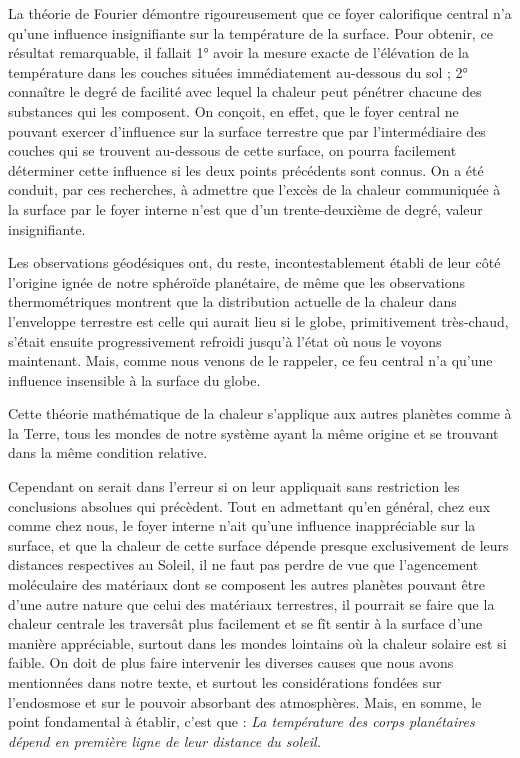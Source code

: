 \documentclass[a4paper, 11pt, oneside]{article}
\begin{document}
La théorie de Fourier démontre rigoureusement que ce foyer calorifique central n'a qu'une influence insignifiante sur la température de la surface. Pour obtenir, ce résultat remarquable, il fallait 1° avoir la mesure exacte de l'élévation de la température dans les couches situées immédiatement au-dessous du sol ; 2° connaître le degré de facilité avec lequel la chaleur peut pénétrer chacune des substances qui les composent. On conçoit, en effet, que le foyer central ne pouvant exercer d'influence sur la surface terrestre que par l'intermédiaire des couches qui se trouvent au-dessous de cette surface, on pourra facilement déterminer cette influence si les deux points précédents sont connus. On a été conduit, par ces recherches, à admettre que l'excès de la chaleur communiquée à la surface par le foyer interne n'est que d'un trente-deuxième de degré, valeur insignifiante.

Les observations géodésiques ont, du reste, incontestablement établi de leur côté l'origine ignée de notre sphéroïde planétaire, de même que les observations thermométriques montrent que la distribution actuelle de la chaleur dans l'enveloppe terrestre est celle qui aurait lieu si le globe, primitivement très-chaud, s'était ensuite progressivement refroidi jusqu'à l'état où nous le voyons maintenant. Mais, comme nous venons de le rappeler, ce feu central n'a qu'une influence insensible à la surface du globe.

Cette théorie mathématique de la chaleur s'applique aux autres planètes comme à la Terre, tous les mondes de notre système ayant la même origine et se trouvant dans la même condition relative.

Cependant on serait dans l'erreur si on leur appliquait sans restriction les conclusions absolues qui précèdent. Tout en admettant qu'en général, chez eux comme chez nous, le foyer interne n'ait qu'une influence inappréciable sur la surface, et que la chaleur de cette surface dépende presque exclusivement de leurs distances respectives au Soleil, il ne faut pas perdre de vue que l'agencement moléculaire des matériaux dont se composent les autres planètes pouvant être d'une autre nature que celui des matériaux terrestres, il pourrait se faire que la chaleur centrale les traversât plus facilement et se fît sentir à la surface d'une manière appréciable, surtout dans les mondes lointains où la chaleur solaire est si faible. On doit de plus faire intervenir les diverses causes que nous avons mentionnées dans notre texte, et surtout les considérations fondées sur l'endosmose et sur le pouvoir absorbant des atmosphères. Mais, en somme, le point fondamental à établir, c'est que : \emph{La température des corps planétaires dépend en première ligne de leur distance du soleil.}
\end{document}
